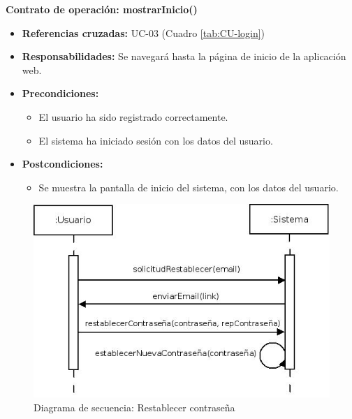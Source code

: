 \textbf{Contrato de operación: mostrarInicio()}
\begin{itemize}
\item \textbf{Referencias cruzadas:} UC-03 (Cuadro \ref{tab:CU-login})
\item \textbf{Responsabilidades:} Se navegará hasta la página de inicio de la aplicación web.
\item \textbf{Precondiciones:} 
 \begin{itemize}
\item El usuario ha sido registrado correctamente.
\item El sistema ha iniciado sesión con los datos del usuario.
\end {itemize}
\item \textbf{Postcondiciones:} 
 \begin{itemize}
\item Se muestra la pantalla de inicio del sistema, con los datos del usuario.
\end {itemize}
\end {itemize}


\vspace{7mm}
\dotfill
\vspace{7mm}

\begin{figure}[h!]
\centering
  \includegraphics[scale=.55]{img/secuencias/gestion-usuarios-restablecer-contrasena.jpeg}
  \caption{Diagrama de secuencia: Restablecer contraseña}
  \label{fig:secuencia-gestion-usuarios-restablecer-contrasena}
\end{figure}


